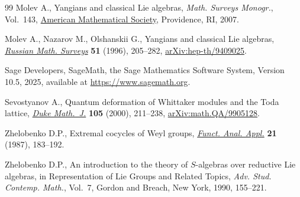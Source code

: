 \begin{thebibliography}{99}
Molev A., Yangians and classical {L}ie algebras, \textit{Math. Surveys
 Monogr.}, Vol.~143, \href{https://doi.org/10.1090/surv/143}{American Mathematical Society}, Providence, RI, 2007.

Molev A., Nazarov M., Olshanskii G., Yangians and classical {L}ie algebras,
  \href{https://doi.org/10.1070/RM1996v051n02ABEH002772}{\textit{Russian Math. Surveys}} \textbf{51} (1996), 205--282,
 \href{https://arxiv.org/abs/hep-th/9409025}{arXiv:hep-th/9409025}.

Sage Developers, {S}ageMath, the {S}age {M}athematics {S}oftware {S}ystem,
 {V}ersion 10.5, 2025, available at \url{https://www.sagemath.org}.

Sevostyanov A., Quantum deformation of {W}hittaker modules and the {T}oda
 lattice, \href{https://doi.org/10.1215/S0012-7094-00-10522-4}{\textit{Duke Math.~J.}} \textbf{105} (2000), 211--238,
 \href{https://arxiv.org/abs/math.QA/9905128}{arXiv:math.QA/9905128}.

Zhelobenko D.P., Extremal cocycles of {W}eyl groups, \href{https://doi.org/10.1007/BF02577133}{\textit{Funct. Anal.
 Appl.}} \textbf{21} (1987), 183--192.

Zhelobenko D.P., An introduction to the theory of {$S$}-algebras over reductive
 {L}ie algebras, in Representation of {L}ie {G}roups and {R}elated {T}opics,
 \textit{Adv. Stud. Contemp. Math.}, Vol.~7, Gordon and Breach, New York,
 1990, 155--221.

\end{thebibliography}
